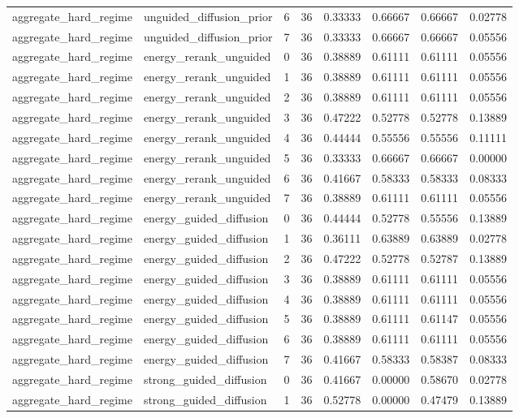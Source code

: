 \documentclass{article}
\begin{document}
\begin{table}[tbp]
{\begin{tabular}{llllllll}
aggregate\_hard\_regime & unguided\_diffusion\_prior & 6 & 36 & 0.33333 & 0.66667 & 0.66667 & 0.02778 \\
aggregate\_hard\_regime & unguided\_diffusion\_prior & 7 & 36 & 0.33333 & 0.66667 & 0.66667 & 0.05556 \\
aggregate\_hard\_regime & energy\_rerank\_unguided & 0 & 36 & 0.38889 & 0.61111 & 0.61111 & 0.05556 \\
aggregate\_hard\_regime & energy\_rerank\_unguided & 1 & 36 & 0.38889 & 0.61111 & 0.61111 & 0.05556 \\
aggregate\_hard\_regime & energy\_rerank\_unguided & 2 & 36 & 0.38889 & 0.61111 & 0.61111 & 0.05556 \\
aggregate\_hard\_regime & energy\_rerank\_unguided & 3 & 36 & 0.47222 & 0.52778 & 0.52778 & 0.13889 \\
aggregate\_hard\_regime & energy\_rerank\_unguided & 4 & 36 & 0.44444 & 0.55556 & 0.55556 & 0.11111 \\
aggregate\_hard\_regime & energy\_rerank\_unguided & 5 & 36 & 0.33333 & 0.66667 & 0.66667 & 0.00000 \\
aggregate\_hard\_regime & energy\_rerank\_unguided & 6 & 36 & 0.41667 & 0.58333 & 0.58333 & 0.08333 \\
aggregate\_hard\_regime & energy\_rerank\_unguided & 7 & 36 & 0.38889 & 0.61111 & 0.61111 & 0.05556 \\
aggregate\_hard\_regime & energy\_guided\_diffusion & 0 & 36 & 0.44444 & 0.52778 & 0.55556 & 0.13889 \\
aggregate\_hard\_regime & energy\_guided\_diffusion & 1 & 36 & 0.36111 & 0.63889 & 0.63889 & 0.02778 \\
aggregate\_hard\_regime & energy\_guided\_diffusion & 2 & 36 & 0.47222 & 0.52778 & 0.52787 & 0.13889 \\
aggregate\_hard\_regime & energy\_guided\_diffusion & 3 & 36 & 0.38889 & 0.61111 & 0.61111 & 0.05556 \\
aggregate\_hard\_regime & energy\_guided\_diffusion & 4 & 36 & 0.38889 & 0.61111 & 0.61111 & 0.05556 \\
aggregate\_hard\_regime & energy\_guided\_diffusion & 5 & 36 & 0.38889 & 0.61111 & 0.61147 & 0.05556 \\
aggregate\_hard\_regime & energy\_guided\_diffusion & 6 & 36 & 0.38889 & 0.61111 & 0.61111 & 0.05556 \\
aggregate\_hard\_regime & energy\_guided\_diffusion & 7 & 36 & 0.41667 & 0.58333 & 0.58387 & 0.08333 \\
aggregate\_hard\_regime & strong\_guided\_diffusion & 0 & 36 & 0.41667 & 0.00000 & 0.58670 & 0.02778 \\
aggregate\_hard\_regime & strong\_guided\_diffusion & 1 & 36 & 0.52778 & 0.00000 & 0.47479 & 0.13889 \\
\bottomrule
\end{tabular}
}
\end{table}
\end{document}
